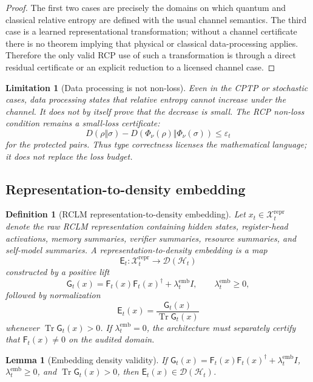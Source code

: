 \documentclass[11pt,a4paper]{article}
\newtheorem{lemma}[theorem]{Lemma}
\newtheorem{definition}[theorem]{Definition}
\newtheorem{limitation}[theorem]{Limitation}
\newcommand{\D}{\mathcal D}
\newcommand{\Hcal}{\mathcal H}
\newcommand{\Xcal}{\mathcal X}
\newcommand{\Tr}{\operatorname{Tr}}
\newcommand{\eps}{\varepsilon}
\newcommand{\reptype}{\mathrm{repr}}
\newcommand{\emb}{\mathrm{emb}}
\begin{document}
\begin{proof}
The first two cases are precisely the domains on which quantum and classical relative entropy are defined with the usual channel semantics. The third case is a learned representational transformation; without a channel certificate there is no theorem implying that physical or classical data-processing applies. Therefore the only valid RCP use of such a transformation is through a direct residual certificate or an explicit reduction to a licensed channel case.
\end{proof}

\begin{limitation}[Data processing is not non-loss]
Even in the CPTP or stochastic cases, data processing states that relative entropy cannot increase under the channel. It does not by itself prove that the decrease is small. The RCP non-loss condition remains a small-loss certificate:
\[
D(\rho\Vert\sigma)-D(\Phi_\nu(\rho)\Vert\Phi_\nu(\sigma))\le\eps_t
\]
for the protected pairs. Thus type correctness licenses the mathematical language; it does not replace the loss budget.
\end{limitation}

\subsection{Representation-to-density embedding}

\begin{definition}[RCLM representation-to-density embedding]
Let \(x_t\in\Xcal_t^{\reptype}\) denote the raw RCLM representation containing hidden states, register-head activations, memory summaries, verifier summaries, resource summaries, and self-model summaries. A representation-to-density embedding is a map
\[
\mathsf E_t:\Xcal_t^{\reptype}\to\D(\Hcal_t)
\]
constructed by a positive lift
\[
\mathsf G_t(x)=\mathsf F_t(x)\mathsf F_t(x)^\dagger+\lambda_t^{\emb} I,
\qquad \lambda_t^{\emb}\ge0,
\]
followed by normalization
\[
\mathsf E_t(x)=\frac{\mathsf G_t(x)}{\Tr \mathsf G_t(x)}
\]
whenever \(\Tr \mathsf G_t(x)>0\). If \(\lambda_t^{\emb}=0\), the architecture must separately certify that \(\mathsf F_t(x)\neq0\) on the audited domain.
\end{definition}

\begin{lemma}[Embedding density validity]
\label{lem:embedding-density-validity}
If \(\mathsf G_t(x)=\mathsf F_t(x)\mathsf F_t(x)^\dagger+\lambda_t^{\emb} I\), \(\lambda_t^{\emb}\ge0\), and \(\Tr\mathsf G_t(x)>0\), then \(\mathsf E_t(x)\in\D(\Hcal_t)\).
\end{lemma}
\end{document}
